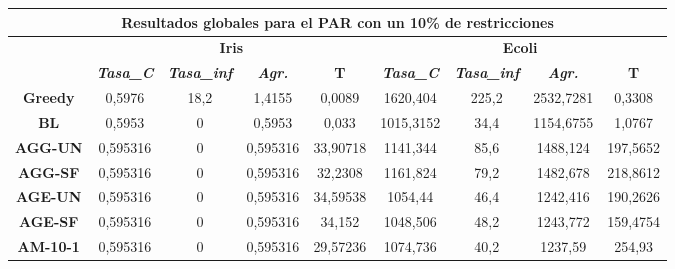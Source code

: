 \documentclass[12pt, spanish]{article}
\begin{document}
\begin{table}[H]
\footnotesize
\begin{tabular}{|c|c|c|c|c|c|c|c|c|}
\hline
\multicolumn{9}{|c|}{\textbf{Resultados globales para el PAR con un 10\% de restricciones}}                                                                                                                           \\ \hline
\multirow{2}{*}{}     & \multicolumn{4}{c|}{\textbf{Iris}}                                                            & \multicolumn{4}{c|}{\textbf{Ecoli}}                                                           \\ \cline{2-9} 
                      & \textit{\textbf{Tasa\_C}} & \textit{\textbf{Tasa\_inf}} & \textit{\textbf{Agr.}} & \textbf{T} & \textit{\textbf{Tasa\_C}} & \textit{\textbf{Tasa\_inf}} & \textit{\textbf{Agr.}} & \textbf{T} \\ \hline
\textbf{Greedy}       & 0,5976                    & 18,2                        & 1,4155                 & 0,0089     & 1620,404                  & 225,2                       & 2532,7281              & 0,3308     \\ \hline
\textbf{BL}           & 0,5953                    & 0                           & 0,5953                 & 0,033      & 1015,3152                 & 34,4                        & 1154,6755              & 1,0767     \\ \hline
\textbf{AGG-UN}       & 0,595316                  & 0                           & 0,595316               & 33,90718   & 1141,344                  & 85,6                        & 1488,124               & 197,5652   \\ \hline
\textbf{AGG-SF}       & 0,595316                  & 0                           & 0,595316               & 32,2308    & 1161,824                  & 79,2                        & 1482,678               & 218,8612   \\ \hline
\textbf{AGE-UN}       & 0,595316                  & 0                           & 0,595316               & 34,59538   & 1054,44                   & 46,4                        & 1242,416               & 190,2626   \\ \hline
\textbf{AGE-SF}       & 0,595316                  & 0                           & 0,595316               & 34,152     & 1048,506                  & 48,2                        & 1243,772               & 159,4754   \\ \hline
\textbf{AM-10-1}      & 0,595316                  & 0                           & 0,595316               & 29,57236   & 1074,736                  & 40,2                        & 1237,59                & 254,93     \\ \hline

\end{tabular}
\end{table}
\end{document}
